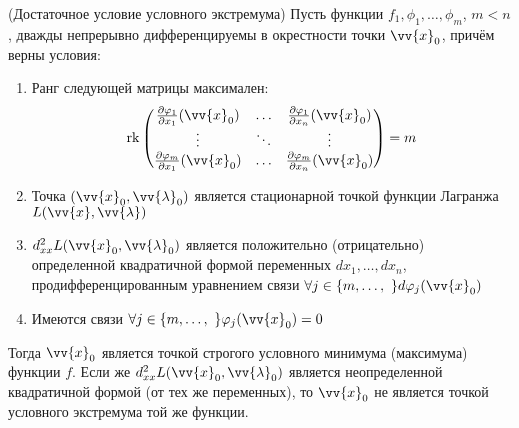 \begin{theorem} (Достаточное условие условного экстремума)
    Пусть функции $f_1, \phi_1, \dots, \phi_m$, $m < n$, дважды непрерывно дифференцируемы в окрестности точки $\vv{x}_0$, причём верны условия:
    \begin{enumerate}
    	\item Ранг следующей матрицы максимален:
    	\[
    		\rk \begin{pmatrix}
	    		\frac{\vdelta \phi_1}{\vdelta x_1}(\vv{x}_0) & \dots & \frac{\vdelta \phi_1}{\vdelta x_n}(\vv{x}_0)
	    		\\
	    		\vdots & \ddots & \vdots
	    		\\
	    		\frac{\vdelta \phi_m}{\vdelta x_1}(\vv{x}_0) & \dots & \frac{\vdelta \phi_m}{\vdelta x_n}(\vv{x}_0)
	    		\\
    		\end{pmatrix} = m
    	\]
    	
    	\item Точка $(\vv{x}_0, \vv{\lambda}_0)$ является стационарной точкой функции Лагранжа $L(\vv{x}, \vv{\lambda})$
    	
    	\item $d^2_{xx}L(\vv{x}_0, \vv{\lambda}_0)$ является положительно (отрицательно) определенной квадратичной формой переменных $dx_1, \ldots, dx_n$, продифференцированным уравнением связи $\forall j \in \range{m}\ d\phi_j(\vv{x}_0)$
    	
    	\item Имеются связи $\forall j \in \range{m}\ \phi_j(\vv{x}_0) = 0$
    \end{enumerate}
	Тогда $\vv{x}_0$ является точкой строгого условного минимума (максимума) функции $f$. Если же $d^2_{xx} L(\vv{x}_0, \vv{\lambda}_0)$ является неопределенной квадратичной формой (от тех же переменных), то $\vv{x}_0$ не является точкой условного экстремума той же функции.
\end{theorem}

